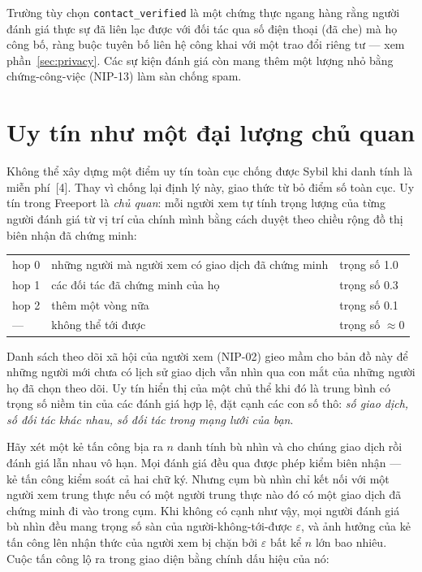 \documentclass[11pt]{article}
\begin{document}
Trường tùy chọn \texttt{contact\_verified} là một chứng thực ngang hàng rằng
người đánh giá thực sự đã liên lạc được với đối tác qua số điện thoại (đã che)
mà họ công bố, ràng buộc tuyên bố liên hệ công khai với một trao đổi riêng tư
--- xem phần~\ref{sec:privacy}. Các sự kiện đánh giá còn mang thêm một lượng
nhỏ bằng chứng-công-việc (NIP-13) làm sàn chống spam.

\section{Uy tín như một đại lượng chủ quan}
\label{sec:subjective}

Không thể xây dựng một điểm uy tín toàn cục chống được Sybil khi danh tính là
miễn phí~[4]. Thay vì chống lại định lý này, giao thức từ bỏ điểm số toàn cục.
Uy tín trong Freeport là \emph{chủ quan}: mỗi người xem tự tính trọng lượng
của từng người đánh giá từ vị trí của chính mình bằng cách duyệt theo chiều
rộng đồ thị biên nhận đã chứng minh:

\begin{center}
\begin{tabular}{lll}
\toprule
hop 0 & những người mà người xem có giao dịch đã chứng minh & trọng số 1.0 \\
hop 1 & các đối tác đã chứng minh của họ                    & trọng số 0.3 \\
hop 2 & thêm một vòng nữa                                   & trọng số 0.1 \\
---   & không thể tới được                                  & trọng số $\approx 0$ \\
\bottomrule
\end{tabular}
\end{center}

Danh sách theo dõi xã hội của người xem (NIP-02) gieo mầm cho bản đồ này để
những người mới chưa có lịch sử giao dịch vẫn nhìn qua con mắt của những người
họ đã chọn theo dõi. Uy tín hiển thị của một chủ thể khi đó là trung bình có
trọng số niềm tin của các đánh giá hợp lệ, đặt cạnh các con số thô:
\emph{số giao dịch, số đối tác khác nhau, số đối tác trong mạng lưới của bạn}.

Hãy xét một kẻ tấn công bịa ra $n$ danh tính bù nhìn và cho chúng giao dịch
rồi đánh giá lẫn nhau vô hạn. Mọi đánh giá đều qua được phép kiểm biên nhận
--- kẻ tấn công kiểm soát cả hai chữ ký. Nhưng cụm bù nhìn chỉ kết nối với một
người xem trung thực nếu có một người trung thực nào đó có một giao dịch đã
chứng minh đi vào trong cụm. Khi không có cạnh như vậy, mọi người đánh giá bù
nhìn đều mang trọng số sàn của người-không-tới-được $\varepsilon$, và ảnh
hưởng của kẻ tấn công lên nhận thức của người xem bị chặn bởi $\varepsilon$
bất kể $n$ lớn bao nhiêu. Cuộc tấn công lộ ra trong giao diện bằng chính dấu
hiệu của nó:
\end{document}
